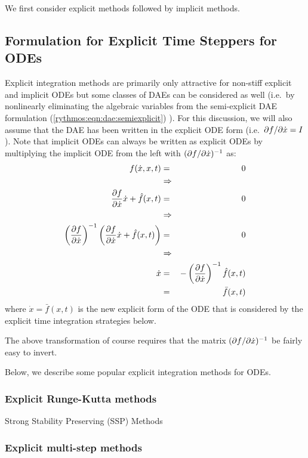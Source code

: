 \documentclass[pdf,ps2pdf,11pt]{SANDreport}
\begin{document}
We first consider explicit methods followed by implicit methods.

\subsection{Formulation for Explicit Time Steppers for ODEs}

Explicit integration methods are primarily only attractive for non-stiff
explicit and implicit ODEs but some classes of DAEs can be considered as well
(i.e.\ by nonlinearly eliminating the algebraic variables from the
semi-explicit DAE formulation (\ref{rythmos:eqn:dae:semiexplicit})
\cite{BCP}).  For this discussion, we will also assume that the DAE has been
written in the explicit ODE form (i.e.\ $\partial f / \partial \dot{x} = I$).  Note that
implicit ODEs can always be written as explicit ODEs by multiplying the
implicit ODE from the left with $(\partial f / \partial \dot{x})^{-1}$ as:
%
\begin{eqnarray*}
f(\dot{x},x,t) & = & 0 \\
& \Rightarrow \\
\displaystyle{\frac{\partial f}{\partial \dot{x}}} \dot{x} + \hat{f}(x,t) & = & 0 \\
& \Rightarrow \\
\left( \displaystyle{\frac{\partial f}{\partial \dot{x}}} \right)^{-1}
\left( \displaystyle{\frac{\partial f}{\partial \dot{x}}} \dot{x} + \hat{f}(x,t) \right) & = & 0 \\
& \Rightarrow \\
\dot{x} & = & -\left( \displaystyle{\frac{\partial f}{\partial \dot{x}}} \right)^{-1} \hat{f}(x,t) \\
& = & \bar{f}(x,t) \\
\end{eqnarray*}
%
where ${}\dot{x} = \bar{f}(x,t)$ is the new explicit form of the ODE that is
considered by the explicit time integration strategies below.

The above transformation of course requires that the matrix
$(\partial f / \partial \dot{x})^{-1}$ be fairly easy to invert.

Below, we describe some popular explicit integration methods for ODEs.

\subsubsection{Explicit Runge-Kutta methods}

Strong Stability Preserving (SSP) Methods \cite{GottliebShuTadmor,GottliebGottlieb}

\subsubsection{Explicit multi-step methods}
\end{document}
